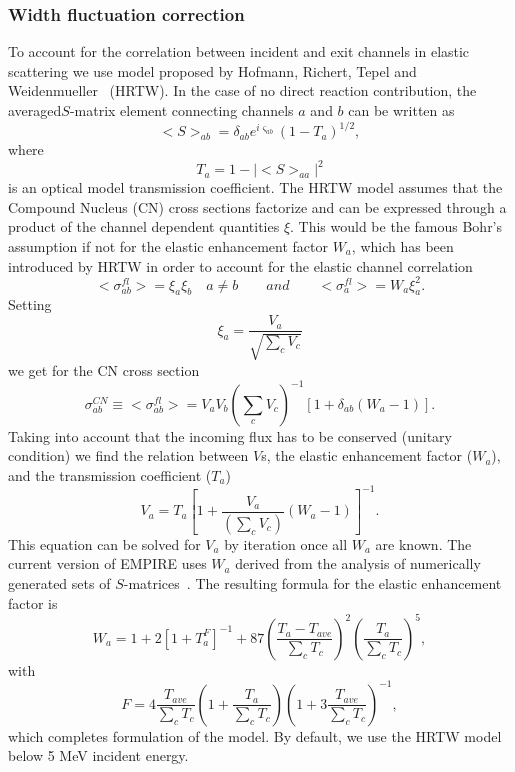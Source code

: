 \documentclass[twocolumn,amsmath,amssymb,10pt,groupedaddress,a4paper]{revtex4}
\begin{document}
\subsubsection{Width fluctuation correction}
To account for the correlation between incident and exit channels in
elastic scattering we use model proposed by Hofmann, Richert, Tepel
and Weidenmueller~\cite{HRTW} (HRTW). In the case of no direct reaction
contribution, the averaged$S$-matrix element connecting channels $a$ and
$b$ can be written as
\begin{equation}
<S>_{ab}=\delta_{ab}e^{i\varsigma_{ab}}(1-T_{a})^{1/2},
\label{Sab}
\end{equation}
\noindent where
\begin{equation}
T_{a}=1-|<S>_{aa}|^{2}
\label{Ta}
\end{equation}
is an optical model transmission coefficient. The HRTW model assumes
that the Compound Nucleus (CN) cross sections factorize and
can be expressed through a product of the channel dependent quantities
$\xi$. This would be the famous Bohr's assumption if not for the
elastic enhancement factor $W_{a}$, which has been introduced by
HRTW in order to account for the elastic channel correlation
\begin{equation}
<\sigma_{ab}^{fl}>=\xi_{a}\xi_{b}\quad a\neq b\qquad and\qquad<\sigma_{a}^{fl}>=W_{a}\xi_{a}^{2}.
\label{Sig-fluc}
\end{equation}
 Setting
\begin{equation}
\xi_{a}=\frac{V_{a}}{\sqrt{\sum_{c}V_{c}}}
\label{ksi}
\end{equation}
we get for the CN cross section
\begin{equation}
\sigma_{ab}^{CN}\equiv<\sigma_{ab}^{fl}>=V_{a}V_{b}\left(\sum_{c}V_{c}\right)^{-1}\left[1+\delta_{ab}\left(W_{a}-1\right)\right].
\label{Sig-flucV}
\end{equation}
Taking into account that the incoming flux has to be conserved (unitary
condition) we find the relation between $V$s, the elastic enhancement
factor ($W_{a}$), and the transmission coefficient ($T_{a}$)
\begin{equation}
V_{a}=T_{a}\left[1+\frac{V_{a}}{\left(\sum_{c}V_{c}\right)}\left(W_{a}-1\right)\right]^{-1}.
\label{Va}
\end{equation}
This equation can be solved for $V_{a}$ by iteration once all $W_{a}$
are known. The current version of EMPIRE uses $W_{a}$ derived from
the analysis of numerically generated sets of $S$-matrices~\cite{HHM}.
The resulting formula for the elastic enhancement factor is
\begin{equation}
W_{a}=1+2\left[1+T_{a}^{F}\right]^{-1}+87\left(\frac{T_{a}-T_{ave}}{\sum_{c}T_{c}}\right)^{2}\left(\frac{T_{a}}{\sum_{c}T_{c}}\right)^{5},
\label{Wa}
\end{equation}
with
\begin{equation}
F=4\frac{T_{ave}}{\sum_{c}T_{c}}\left(1+\frac{T_{a}}{\sum_{c}T_{c}}\right)\left(1+3\frac{T_{ave}}{\sum_{c}T_{c}}\right)^{-1},
\label{Wa-F}
\end{equation}
which completes formulation of the model.
By default, we use the HRTW model below 5 MeV incident
energy.
\end{document}
